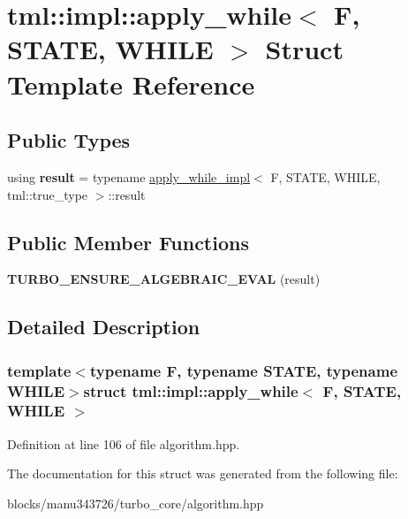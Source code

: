 \hypertarget{structtml_1_1impl_1_1apply__while}{\section{tml\+:\+:impl\+:\+:apply\+\_\+while$<$ F, S\+T\+A\+T\+E, W\+H\+I\+L\+E $>$ Struct Template Reference}
\label{structtml_1_1impl_1_1apply__while}
}
\subsection*{Public Types}
\begin{DoxyCompactItemize}
\item 
\hypertarget{structtml_1_1impl_1_1apply__while_af2f4fb600cf65d256a0a95cb42ae0c68}{using {\bfseries result} = typename \hyperlink{structtml_1_1impl_1_1apply__while__impl}{apply\+\_\+while\+\_\+impl}$<$ F, S\+T\+A\+T\+E, W\+H\+I\+L\+E, tml\+::true\+\_\+type $>$\+::result}\label{structtml_1_1impl_1_1apply__while_af2f4fb600cf65d256a0a95cb42ae0c68}

\end{DoxyCompactItemize}
\subsection*{Public Member Functions}
\begin{DoxyCompactItemize}
\item 
\hypertarget{structtml_1_1impl_1_1apply__while_a7a1a9ceb4e01fad5997bd6ae24d27553}{{\bfseries T\+U\+R\+B\+O\+\_\+\+E\+N\+S\+U\+R\+E\+\_\+\+A\+L\+G\+E\+B\+R\+A\+I\+C\+\_\+\+E\+V\+A\+L} (result)}\label{structtml_1_1impl_1_1apply__while_a7a1a9ceb4e01fad5997bd6ae24d27553}

\end{DoxyCompactItemize}


\subsection{Detailed Description}
\subsubsection*{template$<$typename F, typename S\+T\+A\+T\+E, typename W\+H\+I\+L\+E$>$struct tml\+::impl\+::apply\+\_\+while$<$ F, S\+T\+A\+T\+E, W\+H\+I\+L\+E $>$}



Definition at line 106 of file algorithm.\+hpp.



The documentation for this struct was generated from the following file\+:\begin{DoxyCompactItemize}
\item 
blocks/manu343726/turbo\+\_\+core/algorithm.\+hpp\end{DoxyCompactItemize}
